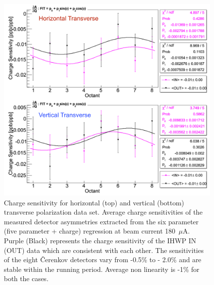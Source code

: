 %

\begin{figure}[!h]
	\begin{center}
	\includegraphics[width=15.0cm]{figures/transverseN2DeltaChargeSensitivity}
	\end{center}
	\caption
	{Charge sensitivity for horizontal (top) and vertical (bottom) transverse polarization data set. Average charge sensitivities of the measured detector asymmetries extracted from the six parameter (five parameter + charge) regression at beam current 180~$\mu$A. Purple (Black) represents the charge sensitivity of the IHWP IN (OUT) data which are consistent with each other. The sensitivities of the eight \v{C}erenkov detectors vary from -0.5\% to - 2.0\% and are stable within the running period. Average non linearity is -1\% for both the cases.}
	\label{fig:transverseN2DeltaChargeSensitivity}
\end{figure}

